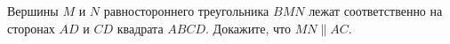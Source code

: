 \begin{ex}
	\begin{condition}
		Вершины \( M \) и \( N  \) равностороннего треугольника \( BMN \) лежат соответственно на сторонах \( AD  \) и \( CD  \) квадрата \( ABCD \). Докажите, что \( MN \parallel AC \).
	\end{condition}
\end{ex}